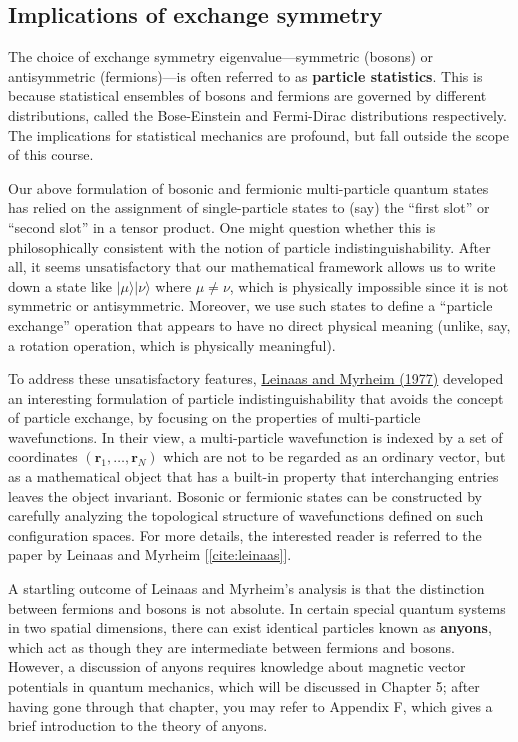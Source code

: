 \documentclass[pra,12pt]{revtex4-2}
\begin{document}
\subsection{Implications of exchange symmetry}

The choice of exchange symmetry eigenvalue---symmetric (bosons) or
antisymmetric (fermions)---is often referred to as \textbf{particle
  statistics}.  This is because statistical ensembles of bosons and
fermions are governed by different distributions, called the
Bose-Einstein and Fermi-Dirac distributions respectively.  The
implications for statistical mechanics are profound, but fall outside
the scope of this course.

Our above formulation of bosonic and fermionic multi-particle quantum
states has relied on the assignment of single-particle states to (say)
the ``first slot'' or ``second slot'' in a tensor product.  One might
question whether this is philosophically consistent with the notion of
particle indistinguishability.  After all, it seems unsatisfactory
that our mathematical framework allows us to write down a state like
$|\mu\rangle|\nu\rangle$ where $\mu\ne\nu$, which is physically
impossible since it is not symmetric or antisymmetric.  Moreover, we
use such states to define a ``particle exchange'' operation that
appears to have no direct physical meaning (unlike, say, a rotation
operation, which is physically meaningful).

To address these unsatisfactory features,
\hyperref[cite:leinaas]{Leinaas and Myrheim (1977)} developed an
interesting formulation of particle indistinguishability that avoids
the concept of particle exchange, by focusing on the properties of
multi-particle wavefunctions.  In their view, a multi-particle
wavefunction is indexed by a set of coordinates $(\mathbf{r}_1, \dots,
\mathbf{r}_N)$ which are not to be regarded as an ordinary vector, but
as a mathematical object that has a built-in property that
interchanging entries leaves the object invariant.  Bosonic or
fermionic states can be constructed by carefully analyzing the
topological structure of wavefunctions defined on such configuration
spaces.  For more details, the interested reader is referred to the
paper by Leinaas and Myrheim [\ref{cite:leinaas}].

A startling outcome of Leinaas and Myrheim's analysis is that the
distinction between fermions and bosons is not absolute.  In certain
special quantum systems in two spatial dimensions, there can exist
identical particles known as \textbf{anyons}, which act as though they
are intermediate between fermions and bosons.  However, a discussion
of anyons requires knowledge about magnetic vector potentials in
quantum mechanics, which will be discussed in Chapter 5; after having
gone through that chapter, you may refer to Appendix F, which gives a
brief introduction to the theory of anyons.
\end{document}
